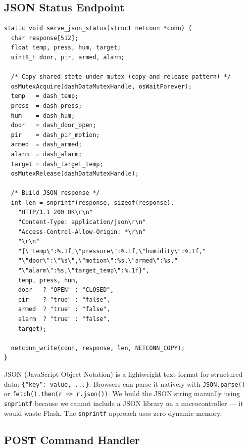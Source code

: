 \documentclass[11pt,a4paper]{article}
\begin{document}
\newpage

\subsection{JSON Status Endpoint}

\begin{lstlisting}
static void serve_json_status(struct netconn *conn) {
  char response[512];
  float temp, press, hum, target;
  uint8_t door, pir, armed, alarm;

  /* Copy shared state under mutex (copy-and-release pattern) */
  osMutexAcquire(dashDataMutexHandle, osWaitForever);
  temp   = dash_temp;
  press  = dash_press;
  hum    = dash_hum;
  door   = dash_door_open;
  pir    = dash_pir_motion;
  armed  = dash_armed;
  alarm  = dash_alarm;
  target = dash_target_temp;
  osMutexRelease(dashDataMutexHandle);

  /* Build JSON response */
  int len = snprintf(response, sizeof(response),
    "HTTP/1.1 200 OK\r\n"
    "Content-Type: application/json\r\n"
    "Access-Control-Allow-Origin: *\r\n"
    "\r\n"
    "{\"temp\":%.1f,\"pressure\":%.1f,\"humidity\":%.1f,"
    "\"door\":\"%s\",\"motion\":%s,\"armed\":%s,"
    "\"alarm\":%s,\"target_temp\":%.1f}",
    temp, press, hum,
    door   ? "OPEN" : "CLOSED",
    pir    ? "true" : "false",
    armed  ? "true" : "false",
    alarm  ? "true" : "false",
    target);

  netconn_write(conn, response, len, NETCONN_COPY);
}
\end{lstlisting}

\begin{infobox}
JSON (JavaScript Object Notation) is a lightweight text format for structured data: \texttt{\{``key'': value, ...\}}. Browsers can parse it natively with \texttt{JSON.parse()} or \texttt{fetch().then(r => r.json())}. We build the JSON string manually using \texttt{snprintf} because we cannot include a JSON library on a microcontroller --- it would waste Flash. The \texttt{snprintf} approach uses zero dynamic memory.
\end{infobox}

\subsection{POST Command Handler}
\end{document}
